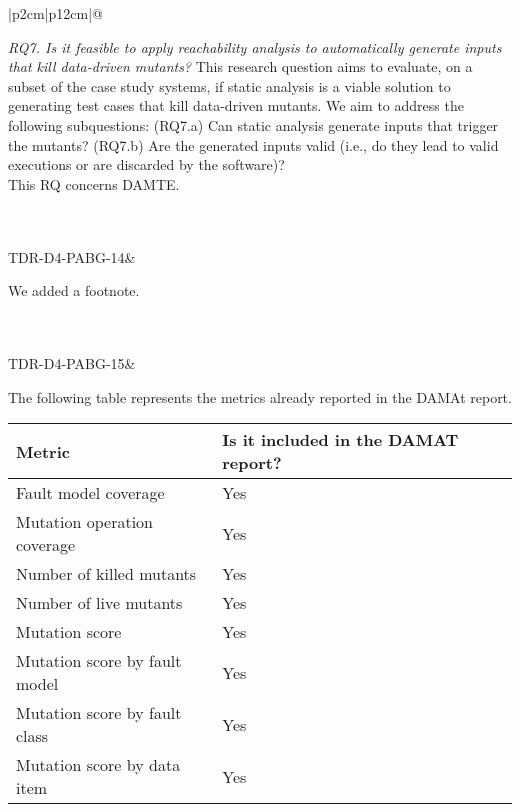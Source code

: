 \begin{longtable}{|p{2cm}|p{12cm}|@{}}
\begin{minipage}{12cm}
\emph{RQ7. Is it feasible to apply reachability analysis to automatically generate inputs that kill data-driven mutants?} This research question aims to evaluate, on a subset of the case study systems, if static analysis is a viable solution to generating test cases that kill data-driven mutants. We aim to address the following subquestions: (RQ7.a) Can static analysis generate inputs that trigger the mutants? (RQ7.b) Are the generated inputs valid (i.e., do they lead to valid executions or are discarded by the software)?\\
This RQ concerns DAMTE.\\

%
%
%
%
%     



\end{minipage}\\
\\
\hline
TDR-D4-PABG-14&
\begin{minipage}{12cm}
We added a footnote.
\end{minipage}\\
\\
\hline
TDR-D4-PABG-15&
\begin{minipage}{12cm}
The following table represents the metrics already reported in the DAMAt report.

\begin{tabular}{|
@{\hspace{1pt}}p{50mm}|
@{\hspace{1pt}}>{\raggedleft\arraybackslash}p{30mm}@{\hspace{1pt}}|
 >{\raggedleft\arraybackslash}p{25mm}@{\hspace{1pt}}|
}
\hline
\textbf{Metric}&\textbf{Is it included in the DAMAT report?}\\
\hline
Fault model coverage&Yes\\
Mutation operation coverage&Yes\\
Number of killed mutants&Yes\\
Number of live mutants&Yes\\
Mutation score&Yes\\
Mutation score by fault model&Yes\\
Mutation score by fault class&Yes\\
Mutation score by data item&Yes\\
\hline
\end{tabular}


\end{minipage}
\end{longtable}
